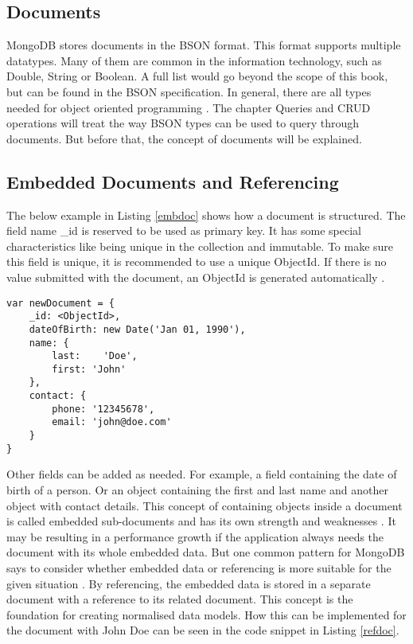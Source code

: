 \subsection{Documents}
MongoDB stores documents in the BSON format. This format supports multiple datatypes. Many of them are common in the information technology, such as Double, String or Boolean. A full list would go beyond the scope of this book, but can be found in the BSON specification. In general, there are all types needed for object oriented programming \cite{bsonspec}. The chapter Queries and CRUD operations will treat the way BSON types can be used to query through documents. But before that, the concept of documents will be explained.

\subsection{Embedded Documents and Referencing}
The below example in Listing \ref{embdoc} shows how a document is structured. The field name \_id is reserved to be used as primary key. It has some special characteristics like being unique in the collection and immutable. To make sure this field is unique, it is recommended to use a unique ObjectId. If there is no value submitted with the document, an ObjectId is generated automatically \cite{mdbdocu}. 

\begin{lstlisting}[frame=single, caption=Embedded Documents, label=embdoc]
var newDocument = {
	_id: <ObjectId>,
	dateOfBirth: new Date('Jan 01, 1990'), 
	name: { 
        last:	 'Doe', 
        first: 'John' 
    },
	contact: {
		phone: '12345678',
		email: 'john@doe.com'
	}
}
\end{lstlisting}

Other fields can be added as needed. For example, a field containing the date of birth of a person. Or an object containing the first and last name and another object with contact details. This concept of containing objects inside a document is called embedded sub-documents and has its own strength and weaknesses \cite{mdbdocu}. It may be resulting in a performance growth if the application always needs the document with its whole embedded data. But one common pattern for MongoDB says to consider whether embedded data or referencing is more suitable for the given situation \cite{mdbinaction}. By referencing, the embedded data is stored in a separate document with a reference to its related document. This concept is the foundation for creating normalised data models. How this can be implemented for the document with John Doe can be seen in the code snippet in Listing \ref{refdoc}.

